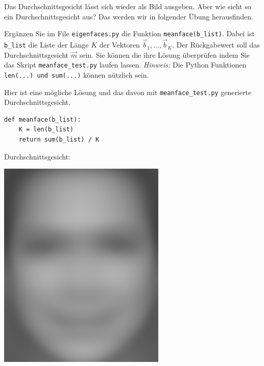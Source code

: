 Das Durchschnittsgesicht lässt sich wieder als Bild ausgeben.
Aber wie sieht so ein Durchschnittsgesicht aus?
Das werden wir in folgender Übung herausfinden.
\begin{aufgabe} \label{aufg:meanface}
	Ergänzen Sie im File \texttt{eigenfaces.py} die Funktion \texttt{meanface(b\_list)}.
	Dabei ist \texttt{b\_list} die Liste der Länge $K$ der Vektoren $\vec b_1,\ldots,\vec b_K$.
	Der Rückgabewert soll das Durchschnittsgesicht $\vec m$ sein.
	Sie können die ihre Lösung überprüfen indem Sie das Skript \texttt{meanface\_test.py} laufen lassen.
	\textit{Hinweis:} Die Python Funktionen \texttt{len(...) und sum(...)} können nützlich sein.
\end{aufgabe}
\begin{losung*}
	Hier ist eine mögliche Lösung und das davon mit \texttt{meanface\_test.py} generierte Durchschnittsgesicht.\\[0.5cm]
	\begin{minipage}{0.45\textwidth}
\begin{lstlisting}[style=python]
def meanface(b_list):
	K = len(b_list)
	return sum(b_list) / K
\end{lstlisting}
	\end{minipage}\hfill
	\begin{minipage}{0.3\textwidth}\vspace{-1cm}
		\centering\hfill Durchschnittsgesicht:
	\end{minipage}
	\begin{minipage}{0.2\textwidth}\vspace{-1cm}
		\centering\includegraphics[width=0.6\textwidth]{images/facespace/meanface}
	\end{minipage}
\end{losung*}
